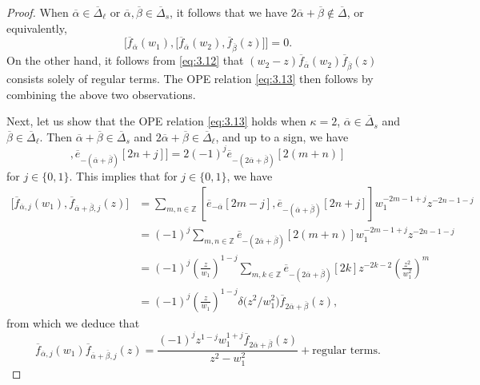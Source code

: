 \documentclass[10pt,a4paper]{amsart}
\numberwithin{equation}{section}
\begin{document}
\begin{proof}
When $\overline{\alpha}\in\overline{\Delta}_{\ell}$ or $\overline{\alpha},\overline{\beta}\in\overline{\Delta}_s$, it follows that we have $2\overline{\alpha}+\overline{\beta} \notin\overline{\Delta}$, or equivalently,
\begin{equation*}
\bigl[\overline{f}_{\overline{\alpha}}(w_1),\bigl[\overline{f}_{\overline{\alpha}}(w_2), \overline{f}_{\overline{\beta}}(z)\bigr]\bigr]=0.
\end{equation*}
On the other hand, it follows from \eqref{eq:3.12} that $(w_2-z)\overline{f}_{\overline{\alpha}}(w_2) \overline{f}_{\overline{\beta}}(z)$ consists solely of regular terms. The OPE relation \eqref{eq:3.13} then follows by combining the above two observations.

Next, let us show that the OPE relation \eqref{eq:3.13} holds when $\kappa=2$, $\overline{\alpha}\in\overline{\Delta}_s$ and $\overline{\beta}\in\overline{\Delta}_{\ell}$. Then $\overline{\alpha}+\overline{\beta}\in\overline{\Delta}_s$ and $2\overline{\alpha}+\overline{\beta}\in\overline{\Delta}_{\ell}$, and up to a sign, we have
\begin{equation*}
[\overline{e}_{-\overline{\alpha}}[2m-j],\overline{e}_{-(\overline{\alpha}+\overline{\beta})}[2n+j]]
=2(-1)^j\overline{e}_{-(2\overline{\alpha}+\overline{\beta})}[2(m+n)]
\end{equation*}
for $j\in\{0,1\}$. This implies that for $j\in\{0,1\}$, we have
\begin{align*}
\bigl[\overline{f}_{\overline{\alpha},j}(w_1), \overline{f}_{\overline{\alpha}+\overline{\beta},j}(z)\bigr]
&=\sum_{m,n\in\mathbb{Z}}[\overline{e}_{-\overline{\alpha}}[2m-j],\overline{e}_{-(\overline{\alpha}+\overline{\beta})}[2n+j]] w_1^{-2m-1+j}z^{-2n-1-j}\\
&=(-1)^j\sum_{m,n\in\mathbb{Z}}\overline{e}_{-(2\overline{\alpha}+\overline{\beta})}[2(m+n)]w_1^{-2m-1+j} z^{-2n-1-j}\\
&=(-1)^j\left(\frac{z}{w_1}\right)^{1-j} \sum_{m,k\in\mathbb{Z}}\overline{e}_{-(2\overline{\alpha}+ \overline{\beta})}[2k]z^{-2k-2}\left(\frac{z^2}{w_1^2} \right)^m\\
&=(-1)^j\left(\frac{z}{w_1}\right)^{1-j}\delta\big(z^2/w_1^2\big) \overline{f}_{2\overline{\alpha}+\overline{\beta}}(z),
\end{align*}
from which we deduce that
\begin{equation}\label{eq:3.14}
\overline{f}_{\overline{\alpha},j}(w_1)\overline{f}_{\overline{\alpha}+\overline{\beta},j}(z)
=\frac{(-1)^jz^{1-j}w_1^{1+j}\overline{f}_{2\overline{\alpha}+ \overline{\beta}}(z)}{z^2-w_1^2}+\text{regular terms}.

\end{equation}
\end{proof}
\end{document}
